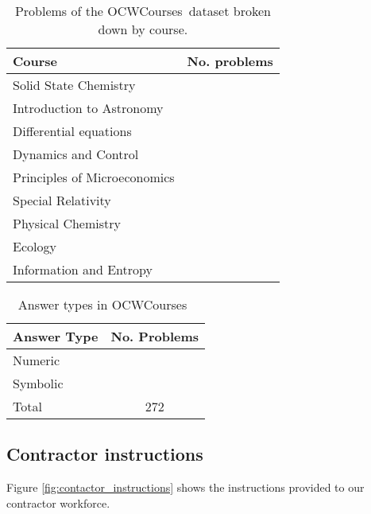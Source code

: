 \documentclass{article}
\newcommand{\ourbenchmark}[0]{{OCWCourses~}}
\begin{document}
\begin{table}[h!]  
\caption{\small Problems of the \ourbenchmark dataset broken down by course.}
\label{table:stem-lite-problems-per-course}
\begin{center}
\begin{tabular}{ lc } 
\toprule
Course & No. problems \\
\midrule
Solid State Chemistry &  \\
Introduction to Astronomy &  \\
Differential equations &  \\
Dynamics and Control &  \\
Principles of Microeconomics &  \\
Special Relativity &  \\
Physical Chemistry &  \\
Ecology &  \\
Information and Entropy &  \\
\bottomrule
\end{tabular}
\end{center}
\end{table}


\begin{table}[t!]  
\caption{\small Answer types in \ourbenchmark}
\label{table:stem-lite-answer-types}
\begin{center}
\begin{tabular}{ lc } 
\toprule
Answer Type & No. Problems\\
\midrule
Numeric &   \\
Symbolic &  \\
\midrule
Total & 272 \\
\bottomrule
\end{tabular}
\end{center}
\end{table}



\subsection{Contractor instructions}

Figure \ref{fig:contactor_instructions} shows the instructions provided to our contractor workforce.
\end{document}

